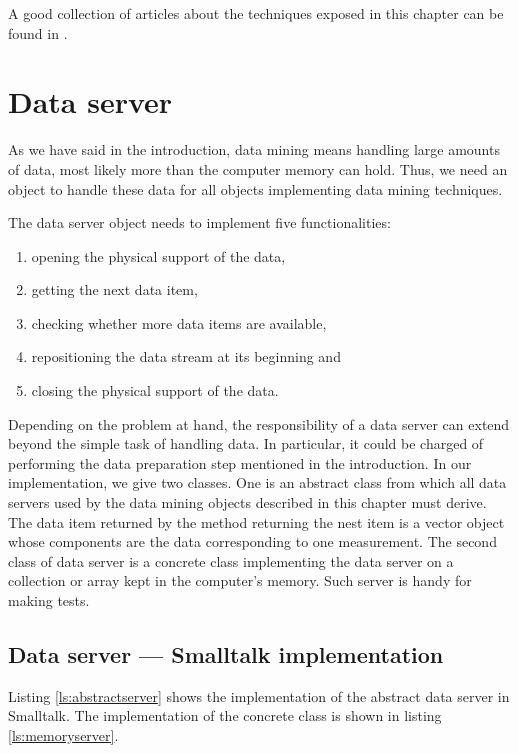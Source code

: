 \documentclass[twoside]{book}
\begin{document}
A good collection of articles about the techniques exposed in this
chapter can be found in \cite{AtchBry}.

\section{Data server}
\label{sec:dataserver}  As we
have said in the introduction, data mining means handling large
amounts of data, most likely more than the computer memory can
hold. Thus, we need an object to handle these data for all objects
implementing data mining techniques.

\noindent The data server object needs to implement five
functionalities:
\begin{enumerate}
  \item opening the physical support of the data,
  \item getting the next data item,
  \item checking whether more data items are available,
  \item repositioning the data stream at its beginning and
  \item closing the physical support of the data.
\end{enumerate}
Depending on the problem at hand, the responsibility of a data
server can extend beyond the simple task of handling data. In
particular, it could be charged of performing the data preparation
step mentioned in the introduction. In our implementation, we give
two classes. One is an abstract class from which all data servers
used by the data mining objects described in this chapter must
derive. The data item returned by the method returning the nest
item is a vector object whose components are the data
corresponding to one measurement. The second class of data server
is a concrete class implementing the data server on a collection
or array kept in the computer's memory. Such server is handy for
making tests.


\subsection{Data server --- Smalltalk implementation}
\label{sec:sdataserver} Listing \ref{ls:abstractserver} shows the
implementation of the abstract data server in Smalltalk. The
implementation of the concrete class is shown in listing
\ref{ls:memoryserver}.
\end{document}
